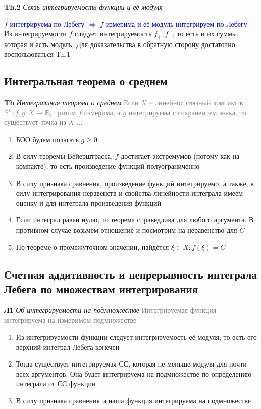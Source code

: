 \textbf{Th.2} \textit{Связь интегрируемость функции и её модуля}

\textcolor{blue}{$f$ интегрируема по Лебегу $\Leftrightarrow$ $f$ измерима и её модуль интегрируем по Лебегу} \\

Из интегрируемости $f$ следует интегрируемость $f_+, f_-$, то есть и их суммы, которая и есть модуль.
Для доказательства в обратную сторону достаточно воспользоваться Th.1

\subsection{Интегральная теорема о среднем}

\textbf{Th} \textit{Интегральная теорема о среднем} \textcolor{gray}{Если $X$ -- линейнос связный компакт
в $\mathbb{R}^n; f, g: X \rightarrow \mathbb{R}$, притом $f$ измерима, а $g$ интегрируема с сохранением знака, то
существует точка из $X$ ...}

\begin{enumerate}
    \item БОО будем полагать $g \geq 0$
    \item В силу теоремы Вейерштрасса, $f$ достигает экстремумов (потому как на компакте), то есть произведение
    функций полуограниченно
    \item В силу признака сравнения, произведение функций интегрируемо, а также, в силу интегрирования неравенств
    и свойства линейности интеграла имеем оценку и для интеграла произведения функций
    \item Если интеграл равен нулю, то теорема справедлива для любого аргумента.
    В противном случае возьмём отношение и посмотрим на неравенство для $C$
    \item По теореме о промежуточном значении, найдётся $\xi \in X: f(\xi) = C$
\end{enumerate}

\subsection{Счетная аддитивность и непрерывность интеграла Лебега по множествам интегрирования}

\textbf{Л1} \textit{Об интегрируемости на подмножестве} \textcolor{gray}{Интегрируемая функция интегрируема на
измеримом подмножестве}

\begin{enumerate}
    \item Из интегрируемости функции следует интегрируемость её модуля, то есть его верхний интеграл Лебега конечен
    \item Тогда существует интегрируемая СС, которая не меньше модуля для почти всех аргументов.
    Она будет интегрируема на подмножестве по определению интеграла от СС функции
    \item В силу признака сравнения и наша функция интегрируема на подмножестве
\end{enumerate}

